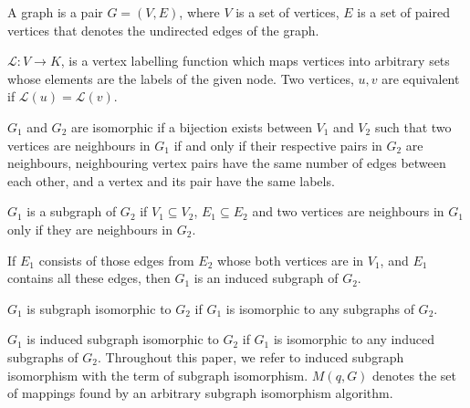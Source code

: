 \begin{definition}[Graph]
    A graph is a pair \(G = (V,E)\), where \(V\) is a set of vertices,
    \(E\) is a set of paired vertices that denotes the undirected edges 
    of the graph. 
\end{definition}

\begin{definition}[Labelling]
    \( \mathcal{L} : V \rightarrow K \), is a vertex labelling function 
    which maps vertices into arbitrary sets whose elements are the labels
    of the given node. Two vertices, \(u, v\) are equivalent if 
    \( \mathcal{L}(u) = \mathcal{L}(v) \).
\end{definition}

\begin{definition}[Isomorphism]
    \(G_1\) and \(G_2\) are isomorphic if a bijection exists between \(V_1\)
    and \(V_2\) such that two vertices are neighbours in \(G_1\) if and only
    if their respective pairs in \(G_2\) are neighbours, neighbouring 
    vertex pairs have the same number of edges between each other, and a
    vertex and its pair have the same labels.
\end{definition}

\begin{definition}[Subgraph]
    \(G_1\) is a subgraph of \(G_2\) if \(V_1 \subseteq V_2 \), \(E_1 \subseteq E_2\)
    and two vertices are neighbours in \(G_1\) only if they are neighbours in \(G_2\).
\end{definition}

\begin{definition}
    If \(E_1\) consists of those edges from \(E_2\) whose both vertices are in
    \(V_1\), and \(E_1\) contains all these edges, then \(G_1\) is an induced
    subgraph of \(G_2\).
\end{definition}

\begin{definition}
    \(G_1\) is subgraph isomorphic to \(G_2\) if \(G_1\) is isomorphic to any
    subgraphs of \(G_2\).
\end{definition}

\begin{definition}
    \(G_1\) is induced subgraph isomorphic to \(G_2\) if \(G_1\) is isomorphic to any
    induced subgraphs of \(G_2\). Throughout this paper, we refer to induced subgraph
    isomorphism with the term of subgraph isomorphism. $M(q, G)$ denotes the set of 
    mappings found by an arbitrary subgraph isomorphism algorithm.
\end{definition}

